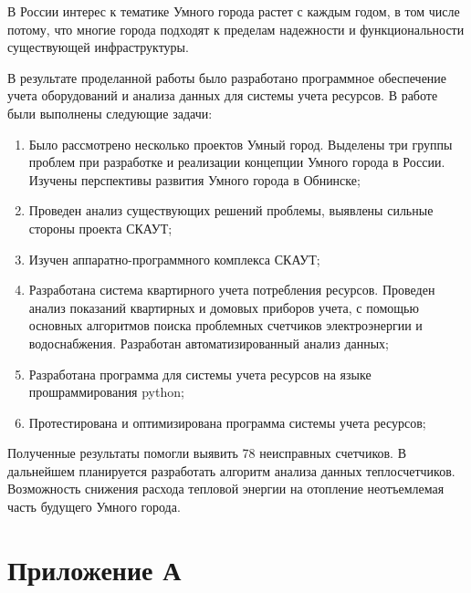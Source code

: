 \documentclass[a4paper,12pt]{article}
\begin{document}
В России интерес к тематике Умного города растет с каждым годом, в том числе потому, что многие города подходят к пределам надежности и функциональности существующей инфраструктуры.

В результате проделанной работы было разработано программное обеспечение учета оборудований и анализа данных для системы учета ресурсов.
В работе были выполнены следующие задачи:

\begin{enumerate}
	\item Было рассмотрено несколько проектов Умный город. Выделены три группы проблем при разработке и реализации концепции Умного города в России. Изучены перспективы развития Умного города в Обнинске;
	\item Проведен анализ существующих решений проблемы, выявлены сильные стороны проекта СКАУТ;
	\item Изучен аппаратно-программного комплекса СКАУТ; 
	\item Разработана система квартирного учета потребления ресурсов. Проведен анализ показаний квартирных и домовых приборов учета, с помощью основных алгоритмов поиска проблемных счетчиков электроэнергии и водоснабжения. Разработан автоматизированный анализ данных;
	\item Разработана программа для системы учета ресурсов на языке прошраммирования python;
	\item Протестирована и оптимизирована программа системы учета ресурсов;	
\end{enumerate}

Полученные результаты помогли выявить 78 неисправных счетчиков. В дальнейшем планируется разработать алгоритм анализа данных теплосчетчиков. Возможность снижения расхода тепловой энергии на отопление неотъемлемая часть будущего Умного города.


\pagebreak

\printbibliography

\pagebreak

\section*{ \centering Приложение А} 
\end{document}
